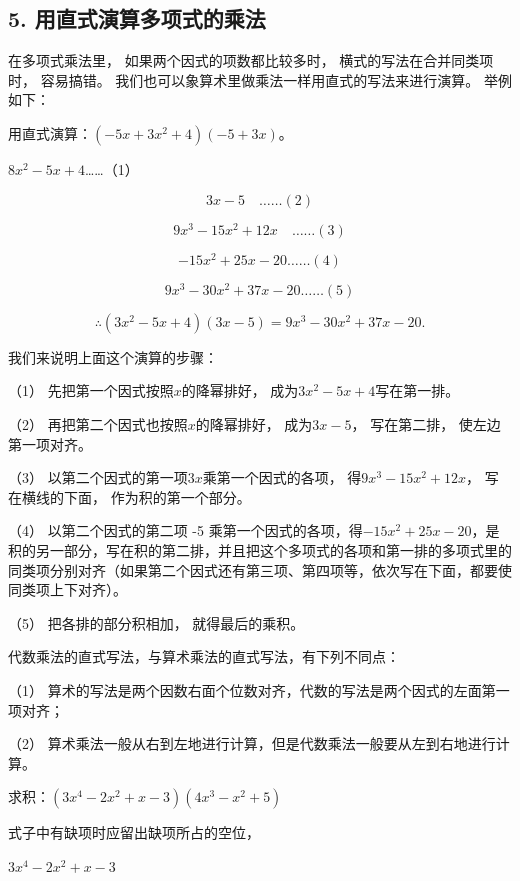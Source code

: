 \subsection{5. 用直式演算多项式的乘法}

在多项式乘法里， 如果两个因式的项数都比较多时，
横式的写法在合并同类项时， 容易搞错。
我们也可以象算术里做乘法一样用直式的写法来进行演算。 举例如下：

 用直式演算：\((-5x+3x^{2}+4)(-5+3x)\)。

\(8x^{2} - 5x + 4\)\ldots\ldots（1）

\[
3 x - 5 \quad \dots \dots (2)
\]

\[
9 x ^{3} - 15 x ^{2} + 12 x \quad \dots \dots (3)
\]

\[
- 15 x ^{2} + 25 x - 20 \dots \dots (4)
\]

\[
9 x ^{3} - 30 x ^{2} + 37 x - 20 \dots \dots (5)
\]

\[
\therefore (3 x ^{2} - 5 x + 4) (3 x - 5) = 9 x ^{3} - 30 x ^{2} + 37 x - 20.
\]

我们来说明上面这个演算的步骤：

（1） 先把第一个因式按照\(x\)的降幂排好，
成为\(3x^{2} - 5x + 4\)写在第一排。

（2） 再把第二个因式也按照\(x\)的降幂排好， 成为\(3x - 5\)，
写在第二排， 使左边第一项对齐。

（3） 以第二个因式的第一项\(3x\)乘第一个因式的各项，
得\(9x^{3} - 15x^{2} + 12x\)， 写在横线的下面， 作为积的第一个部分。

（4） 以第二个因式的第二项 -5
乘第一个因式的各项，得\(-15x^{2}+25x-20\)，是积的另一部分，写在积的第二排，并且把这个多项式的各项和第一排的多项式里的同类项分别对齐（如果第二个因式还有第三项、第四项等，依次写在下面，都要使同类项上下对齐）。

（5） 把各排的部分积相加， 就得最后的乘积。

代数乘法的直式写法，与算术乘法的直式写法，有下列不同点：

（1）
算术的写法是两个因数右面个位数对齐，代数的写法是两个因式的左面第一项对齐；

（2）
算术乘法一般从右到左地进行计算，但是代数乘法一般要从左到右地进行计算。

 求积：\((3x^{4} - 2x^{2} + x - 3)(4x^{3} - x^{2} + 5)\)

 式子中有缺项时应留出缺项所占的空位，

\(3x^{4} - 2x^{2} + x - 3\)

